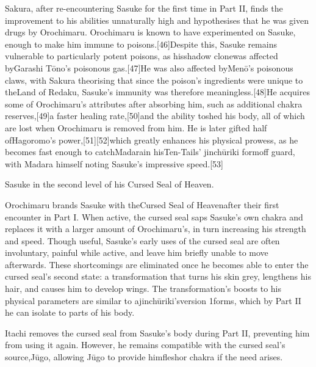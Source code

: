 \documentclass[a4paper,12pt]{article}
\begin{document}
Sakura, after re-encountering Sasuke for the first time in Part II, finds the improvement to his abilities unnaturally high and hypothesises that he was given drugs by Orochimaru. Orochimaru is known to have experimented on Sasuke, enough to make him immune to poisons.[46]Despite this, Sasuke remains vulnerable to particularly potent poisons, as hisshadow clonewas affected byGarashi Tōno's poisonous gas.[47]He was also affected byMenō's poisonous claws, with Sakura theorising that since the poison's ingredients were unique to theLand of Redaku, Sasuke's immunity was therefore meaningless.[48]He acquires some of Orochimaru's attributes after absorbing him, such as additional chakra reserves,[49]a faster healing rate,[50]and the ability toshed his body, all of which are lost when Orochimaru is removed from him. He is later gifted half ofHagoromo's power,[51][52]which greatly enhances his physical prowess, as he becomes fast enough to catchMadarain hisTen-Tails' jinchūriki formoff guard, with Madara himself noting Sasuke’s impressive speed.[53]\\ \par \vspace{0.5cm}

Sasuke in the second level of his Cursed Seal of Heaven.\\ \par \vspace{0.5cm}

Orochimaru brands Sasuke with theCursed Seal of Heavenafter their first encounter in Part I. When active, the cursed seal saps Sasuke's own chakra and replaces it with a larger amount of Orochimaru's, in turn increasing his strength and speed. Though useful, Sasuke's early uses of the cursed seal are often involuntary, painful while active, and leave him briefly unable to move afterwards. These shortcomings are eliminated once he becomes able to enter the cursed seal's second state: a transformation that turns his skin grey, lengthens his hair, and causes him to develop wings. The transformation's boosts to his physical parameters are similar to ajinchūriki'sversion 1forms, which by Part II he can isolate to parts of his body.\\ \par \vspace{0.5cm}

Itachi removes the cursed seal from Sasuke's body during Part II, preventing him from using it again. However, he remains compatible with the cursed seal's source,Jūgo, allowing Jūgo to provide himfleshor chakra if the need arises.\\ \par \vspace{0.5cm}
\end{document}
